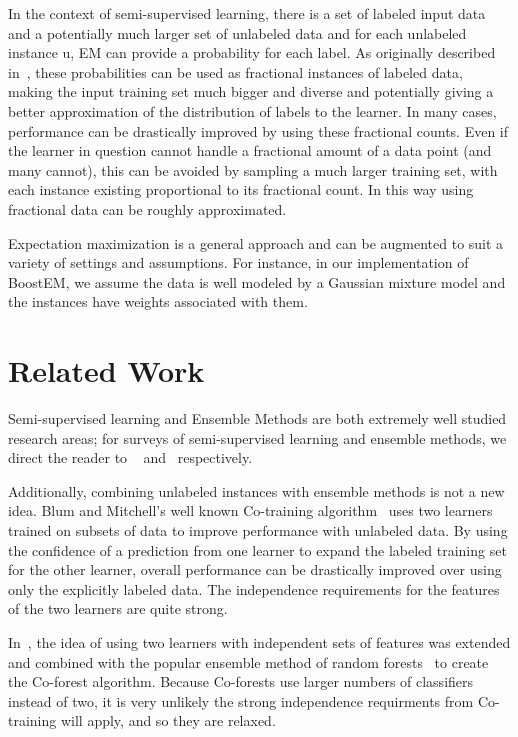 \documentclass{sig-alternate}
\begin{document}
In the context of semi-supervised learning, there is a set of labeled input data and a potentially much larger set of unlabeled data and for each unlabeled instance u, EM can provide a probability for each label. As originally described in~\cite{nigam2000text}, these probabilities can be used as fractional instances of labeled data, making the input training set much bigger and diverse and potentially giving a better approximation of the distribution of labels to the learner. In many cases, performance can be drastically improved by using these fractional counts. Even if the learner in question cannot handle a fractional amount of a data point (and many cannot), this can be avoided by sampling a much larger training set, with each instance existing proportional to its fractional count. In this way using fractional data can be roughly approximated.

Expectation maximization is a general approach and can be augmented to suit a variety of settings and assumptions. For instance, in our implementation of BoostEM, we assume the data is well modeled by a Gaussian mixture model and the instances have weights associated with them.
     
\section{Related Work}
Semi-supervised learning and Ensemble Methods are both extremely well studied research areas; for surveys of semi-supervised learning and ensemble methods, we direct the reader to ~\cite{zhu05survey} and~\cite{dietterichl2002ensemble} respectively. 

Additionally, combining unlabeled instances with ensemble methods is not a new idea. Blum and Mitchell's well known Co-training algorithm~\cite{blum1998combining} uses two learners trained on subsets of data to improve performance with unlabeled data. By using the confidence of a prediction from one learner to expand the labeled training set for the other learner, overall performance can be drastically improved over using only the explicitly labeled data. The independence requirements for the features of the two learners are quite strong. 

In~\cite{li2007improve}, the idea of using two learners with independent sets of features was extended and combined with the popular ensemble method of random forests~\cite{breiman2001random} to create the Co-forest algorithm. Because Co-forests use larger numbers of classifiers instead of two, it is very unlikely the strong independence requirments from Co-training will apply, and so they are relaxed.
\end{document}
